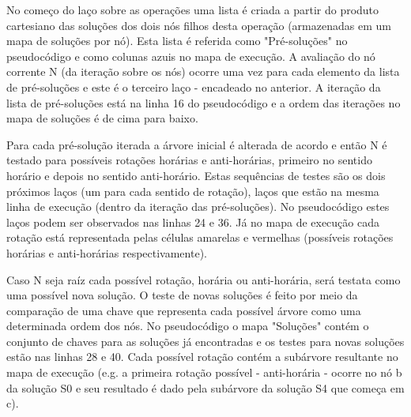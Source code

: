 No começo do laço sobre as operações uma lista é criada a partir do produto cartesiano das soluções dos dois nós filhos desta operação (armazenadas em um mapa de soluções por nó). Esta lista é referida como "Pré-soluções" no pseudocódigo e como colunas azuis no mapa de execução. A avaliação do nó corrente N (da iteração sobre os nós) ocorre uma vez para cada elemento da lista de pré-soluções e este é o terceiro laço - encadeado no anterior. A iteração da lista de pré-soluções está na linha 16 do pseudocódigo e a ordem das iterações no mapa de soluções é de cima para baixo.

Para cada pré-solução iterada a árvore inicial é alterada de acordo e então N é testado para possíveis rotações horárias e anti-horárias, primeiro no sentido horário e depois no sentido anti-horário. Estas sequências de testes são os dois próximos laços (um para cada sentido de rotação), laços que estão na mesma linha de execução (dentro da iteração das pré-soluções). No pseudocódigo estes laços podem ser observados nas linhas 24 e 36. Já no mapa de execução cada rotação está representada pelas células amarelas e vermelhas (possíveis rotações horárias e anti-horárias respectivamente).

Caso N seja raíz cada possível rotação, horária ou anti-horária, será testata como uma possível nova solução. O teste de novas soluções é feito por meio da comparação de uma chave que representa cada possível árvore como uma determinada ordem dos nós. No pseudocódigo o mapa "Soluções" contém o conjunto de chaves para as soluções já encontradas e os testes para novas soluções estão nas linhas 28 e 40. Cada possível rotação contém a subárvore resultante no mapa de execução (e.g. a primeira rotação possível - anti-horária - ocorre no nó b da solução S0 e seu resultado é dado pela subárvore da solução S4 que começa em c).

	
	
